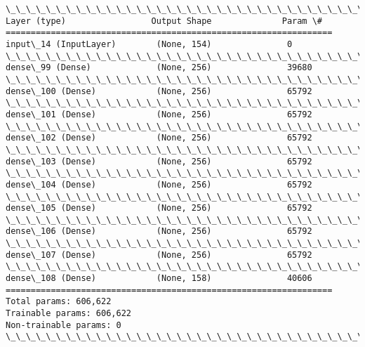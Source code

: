 \documentclass[11pt]{article}
\begin{document}
    \begin{Verbatim}[commandchars=\\\{\}]
\_\_\_\_\_\_\_\_\_\_\_\_\_\_\_\_\_\_\_\_\_\_\_\_\_\_\_\_\_\_\_\_\_\_\_\_\_\_\_\_\_\_\_\_\_\_\_\_\_\_\_\_\_\_\_\_\_\_\_\_\_\_\_\_\_
Layer (type)                 Output Shape              Param \#   
=================================================================
input\_14 (InputLayer)        (None, 154)               0         
\_\_\_\_\_\_\_\_\_\_\_\_\_\_\_\_\_\_\_\_\_\_\_\_\_\_\_\_\_\_\_\_\_\_\_\_\_\_\_\_\_\_\_\_\_\_\_\_\_\_\_\_\_\_\_\_\_\_\_\_\_\_\_\_\_
dense\_99 (Dense)             (None, 256)               39680     
\_\_\_\_\_\_\_\_\_\_\_\_\_\_\_\_\_\_\_\_\_\_\_\_\_\_\_\_\_\_\_\_\_\_\_\_\_\_\_\_\_\_\_\_\_\_\_\_\_\_\_\_\_\_\_\_\_\_\_\_\_\_\_\_\_
dense\_100 (Dense)            (None, 256)               65792     
\_\_\_\_\_\_\_\_\_\_\_\_\_\_\_\_\_\_\_\_\_\_\_\_\_\_\_\_\_\_\_\_\_\_\_\_\_\_\_\_\_\_\_\_\_\_\_\_\_\_\_\_\_\_\_\_\_\_\_\_\_\_\_\_\_
dense\_101 (Dense)            (None, 256)               65792     
\_\_\_\_\_\_\_\_\_\_\_\_\_\_\_\_\_\_\_\_\_\_\_\_\_\_\_\_\_\_\_\_\_\_\_\_\_\_\_\_\_\_\_\_\_\_\_\_\_\_\_\_\_\_\_\_\_\_\_\_\_\_\_\_\_
dense\_102 (Dense)            (None, 256)               65792     
\_\_\_\_\_\_\_\_\_\_\_\_\_\_\_\_\_\_\_\_\_\_\_\_\_\_\_\_\_\_\_\_\_\_\_\_\_\_\_\_\_\_\_\_\_\_\_\_\_\_\_\_\_\_\_\_\_\_\_\_\_\_\_\_\_
dense\_103 (Dense)            (None, 256)               65792     
\_\_\_\_\_\_\_\_\_\_\_\_\_\_\_\_\_\_\_\_\_\_\_\_\_\_\_\_\_\_\_\_\_\_\_\_\_\_\_\_\_\_\_\_\_\_\_\_\_\_\_\_\_\_\_\_\_\_\_\_\_\_\_\_\_
dense\_104 (Dense)            (None, 256)               65792     
\_\_\_\_\_\_\_\_\_\_\_\_\_\_\_\_\_\_\_\_\_\_\_\_\_\_\_\_\_\_\_\_\_\_\_\_\_\_\_\_\_\_\_\_\_\_\_\_\_\_\_\_\_\_\_\_\_\_\_\_\_\_\_\_\_
dense\_105 (Dense)            (None, 256)               65792     
\_\_\_\_\_\_\_\_\_\_\_\_\_\_\_\_\_\_\_\_\_\_\_\_\_\_\_\_\_\_\_\_\_\_\_\_\_\_\_\_\_\_\_\_\_\_\_\_\_\_\_\_\_\_\_\_\_\_\_\_\_\_\_\_\_
dense\_106 (Dense)            (None, 256)               65792     
\_\_\_\_\_\_\_\_\_\_\_\_\_\_\_\_\_\_\_\_\_\_\_\_\_\_\_\_\_\_\_\_\_\_\_\_\_\_\_\_\_\_\_\_\_\_\_\_\_\_\_\_\_\_\_\_\_\_\_\_\_\_\_\_\_
dense\_107 (Dense)            (None, 256)               65792     
\_\_\_\_\_\_\_\_\_\_\_\_\_\_\_\_\_\_\_\_\_\_\_\_\_\_\_\_\_\_\_\_\_\_\_\_\_\_\_\_\_\_\_\_\_\_\_\_\_\_\_\_\_\_\_\_\_\_\_\_\_\_\_\_\_
dense\_108 (Dense)            (None, 158)               40606     
=================================================================
Total params: 606,622
Trainable params: 606,622
Non-trainable params: 0
\_\_\_\_\_\_\_\_\_\_\_\_\_\_\_\_\_\_\_\_\_\_\_\_\_\_\_\_\_\_\_\_\_\_\_\_\_\_\_\_\_\_\_\_\_\_\_\_\_\_\_\_\_\_\_\_\_\_\_\_\_\_\_\_\_

    \end{Verbatim}
\end{document}
